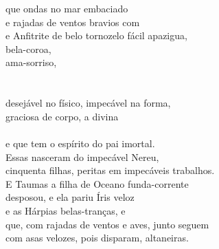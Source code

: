 \begin{pages}
\begin{Rightside}
 que ondas no mar embaciado\\
e rajadas de ventos bravios com \\
e Anfitrite de belo tornozelo fácil apazigua,\\
   bela-coroa, \\
 ama-sorriso, \\
  \\
  \\
 desejável no físico, impecável na forma,\\
 graciosa de corpo, a divina  \\
   \\
e  que tem o espírito do pai imortal.\\
Essas nasceram do impecável Nereu,\\
cinquenta filhas, peritas em impecáveis trabalhos.\\

\quad{}E Taumas a filha de Oceano funda-corrente \\
desposou,  e ela pariu Íris veloz\\
e as Hárpias belas-tranças,  e \\
que, com rajadas de ventos e aves, junto seguem\\
com asas velozes, pois disparam, altaneiras.\\[5pt]


\end{Rightside}
\end{pages}
